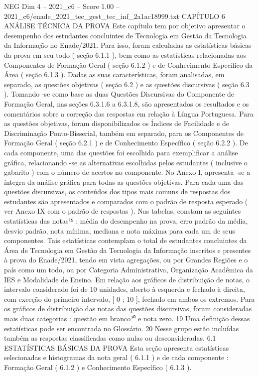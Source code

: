 \begin{textsample}{NEG Dim 4 – 2021\_c6 – Score 1.00 – 2021\_c6/enade\_2021\_tec\_gest\_tec\_inf\_2a1ac18999.txt}  \label{ex:f4_neg_297}
CAPÍTULO 6 ANÁLISE TÉCNICA DA PROVA Este capítulo tem por objetivo apresentar o desempenho dos estudantes concluintes de Tecnologia em Gestão da Tecnologia da Informação no Enade/2021.
Para isso, foram calculadas as estatísticas básicas da prova em seu todo ( seção 6.1.1 ), bem como as estatísticas relacionadas aos Componentes de Formação Geral ( seção 6.1.2 ) e de Conhecimento Específico da Área ( seção 6.1.3 ).
Dadas as suas características, foram analisadas, em separado, as questões objetivas ( seção 6.2 ) e as questões discursivas ( seção 6.3 ).
Tomando -se como base as duas Questões Discursivas do Componente de Formação Geral, nas seções 6.3.1.6 a 6.3.1.8, são apresentados os resultados e os comentários sobre a correção das respostas em relação à Língua Portuguesa.
Para as questões objetivas, foram disponibilizados os Índices de Facilidade e de Discriminação Ponto-Bisserial, também em separado, para os Componentes de Formação Geral ( seção 6.2.1 ) e de Conhecimento Específico ( seção 6.2.2 ).
De cada componente, uma das questões foi escolhida para exemplificar a análise gráfica, relacionando -se as alternativas escolhidas pelos estudantes ( inclusive o gabarito ) com o número de acertos no componente.
No Anexo I, apresenta -se a íntegra da análise gráfica para todas as questões objetivas.
Para cada uma das questões discursivas, os conteúdos dos tipos mais comuns de respostas dos estudantes são apresentados e comparados com o padrão de resposta esperado ( ver Anexo IX com o padrão de respostas ).
Nas tabelas, constam as seguintes estatísticas das notas¹⁹ : média do desempenho na prova, erro padrão da média, desvio padrão, nota mínima, mediana e nota máxima para cada um de seus componentes.
Tais estatísticas contemplam o total de estudantes concluintes da Área de Tecnologia em Gestão da Tecnologia da Informação inscritos e presentes à prova do Enade/2021, tendo em vista agregações, ou por Grandes Regiões e o país como um todo, ou por Categoria Administrativa, Organização Acadêmica da IES e Modalidade de Ensino.
Em relação aos gráficos de distribuição de notas, o intervalo considerado foi de 10 unidades, aberto à esquerda e fechado à direita, com exceção do primeiro intervalo, [ 0 ; 10 ], fechado em ambos os extremos.
Para os gráficos de distribuição das notas das questões discursivas, foram consideradas mais duas categorias : questão em branco²⁰ e nota zero. 19 Uma definição dessas estatísticas pode ser encontrada no Glossário. 20 Nesse grupo estão incluídas também as respostas classificadas como nulas ou desconsideradas. 6.1 ESTATÍSTICAS BÁSICAS DA PROVA Esta seção apresenta estatísticas selecionadas e histogramas da nota geral ( 6.1.1 ) e de cada componente : Formação Geral ( 6.1.2 ) e Conhecimento Específico ( 6.1.3 ).

\end{textsample}
